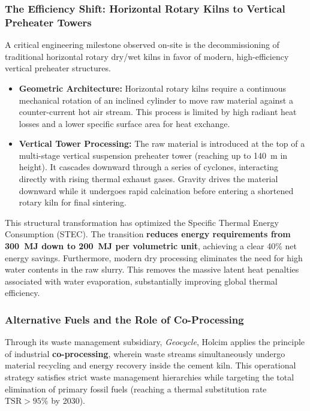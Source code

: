 \subsubsection{The Efficiency Shift: Horizontal Rotary Kilns to Vertical Preheater Towers}
A critical engineering milestone observed on-site is the decommissioning of traditional horizontal rotary dry/wet kilns in favor of modern, high-efficiency vertical preheater structures. 
\begin{itemize}
    \item \textbf{Geometric Architecture:} Horizontal rotary kilns require a continuous mechanical rotation of an inclined cylinder to move raw material against a counter-current hot air stream. This process is limited by high radiant heat losses and a lower specific surface area for heat exchange.
    \item \textbf{Vertical Tower Processing:} The raw material is introduced at the top of a multi-stage vertical suspension preheater tower (reaching up to \num{140}~\si{\meter} in height). It cascades downward through a series of cyclones, interacting directly with rising thermal exhaust gases. Gravity drives the material downward while it undergoes rapid calcination before entering a shortened rotary kiln for final sintering.
\end{itemize}

This structural transformation has optimized the Specific Thermal Energy Consumption (STEC). The transition \textbf{reduces energy requirements from \num{300}~\si{\mega\joule} down to \num{200}~\si{\mega\joule} per volumetric unit}, achieving a clear \num{40}\% net energy savings. Furthermore, modern dry processing eliminates the need for high water contents in the raw slurry. This removes the massive latent heat penalties associated with water evaporation, substantially improving global thermal efficiency.

\subsubsection{Alternative Fuels and the Role of Co-Processing}
Through its waste management subsidiary, \textit{Geocycle}, Holcim applies the principle of industrial \textbf{co-processing}, wherein waste streams simultaneously undergo material recycling and energy recovery inside the cement kiln. This operational strategy satisfies strict waste management hierarchies while targeting the total elimination of primary fossil fuels (reaching a thermal substitution rate $\text{TSR} > 95\%$ by 2030).

